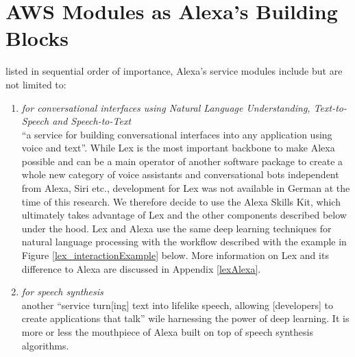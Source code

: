 
\section{AWS Modules as Alexa's Building Blocks }
\label{aws:modules}

listed in sequential order of importance, Alexa's service modules include but are not limited to: 

\begin{enumerate}

	\item[\href{https://aws.amazon.com/lex/}{\textbf{Lex}} \footnote{\url{https://aws.amazon.com/lex}}] \textit{for conversational interfaces using Natural Language Understanding, Text-to-Speech and Speech-to-Text} \\
	``a service for building conversational interfaces into any application using voice and text''\cite{aws_website}.
	While Lex is the most important backbone to make Alexa possible and can be a main operator of another software package to create a whole new category of voice assistants and conversational bots independent from Alexa, Siri etc., development for Lex was not available in German at the time of this research. We therefore decide to use the Alexa Skills Kit, which ultimately takes advantage of Lex and the other components described below under the hood. Lex and Alexa use the same deep learning techniques for natural language processing with the workflow described with the example in Figure \ref{lex_interactionExample} below. More information on Lex and its difference to Alexa are discussed in Appendix \ref{lexAlexa}.
%	
%
%

	
	
	\item[\href{https://aws.amazon.com/polly/}{\textbf{Polly}} \footnote{\url{https://aws.amazon.com/polly}}] \textit{for speech synthesis\\}
	another ``service turn[ing] text into lifelike speech, allowing [developers] to create applications that talk'' \cite{aws_website} wile harnessing the power of deep learning. It is more or less the mouthpiece of Alexa built on top of speech synthesis algorithms.
	

\end{enumerate}
